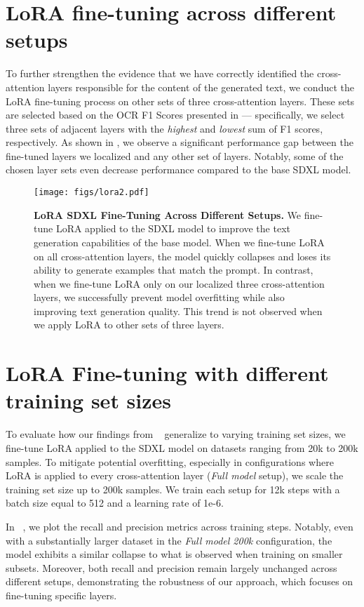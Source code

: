 \newpage
\section{LoRA fine-tuning across different setups}
To further strengthen the evidence that we have correctly identified the cross-attention layers responsible for the content of the generated text, we conduct the LoRA fine-tuning process on other sets of three cross-attention layers. These sets are selected based on the OCR F1 Scores presented in  — specifically, we select three sets of adjacent layers with the \textit{highest} and \textit{lowest} sum of F1 scores, respectively. As shown in , we observe a significant performance gap between the fine-tuned layers we localized and any other set of layers. Notably, some of the chosen layer sets even decrease performance compared to the base SDXL model.

\begin{figure}[h]
    \centering
    \texttt{[image: figs/lora2.pdf]}
    \caption{
        \textbf{LoRA SDXL Fine-Tuning Across Different Setups.} We fine-tune LoRA applied to the SDXL model to improve the text generation capabilities of the base model. When we fine-tune LoRA on all cross-attention layers, the model quickly collapses and loses its ability to generate examples that match the prompt. In contrast, when we fine-tune LoRA only on our localized three cross-attention layers, we successfully prevent model overfitting while also improving text generation quality. This trend is not observed when we apply LoRA to other sets of three layers.}
    \label{fig:lora_ocr2}
\end{figure}


\section{LoRA Fine-tuning with different training set sizes}
To evaluate how our findings from ~ generalize to varying training set sizes, we fine-tune LoRA applied to the SDXL model on datasets ranging from 20k to 200k samples. To mitigate potential overfitting, especially in configurations where LoRA is applied to every cross-attention layer (\textit{Full model} setup), we scale the training set size up to 200k samples. We train each setup for 12k steps with a batch size equal to 512 and a learning rate of 1e-6.

In ~, we plot the recall and precision metrics across training steps. Notably, even with a substantially larger dataset in the \textit{Full model 200k} configuration, the model exhibits a similar collapse to what is observed when training on smaller subsets. Moreover, both recall and precision remain largely unchanged across different setups, demonstrating the robustness of our approach, which focuses on fine-tuning specific layers.


